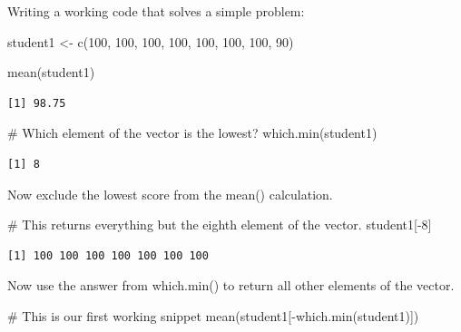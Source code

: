 \documentclass[
  letterpaper,
  DIV=11,
  numbers=noendperiod]{scrartcl}
\newenvironment{Shaded}{\begin{snugshade}}{\end{snugshade}}
\newcommand{\CommentTok}[1]{\textcolor[rgb]{0.37,0.37,0.37}{#1}}
\newcommand{\DecValTok}[1]{\textcolor[rgb]{0.68,0.00,0.00}{#1}}
\newcommand{\FunctionTok}[1]{\textcolor[rgb]{0.28,0.35,0.67}{#1}}
\newcommand{\NormalTok}[1]{\textcolor[rgb]{0.00,0.23,0.31}{#1}}
\newcommand{\OtherTok}[1]{\textcolor[rgb]{0.00,0.23,0.31}{#1}}
\newcommand{\SpecialCharTok}[1]{\textcolor[rgb]{0.37,0.37,0.37}{#1}}
\begin{document}
Writing a working code that solves a simple problem:

\begin{Shaded}
\begin{Highlighting}[]
\NormalTok{student1 }\OtherTok{\textless{}{-}} \FunctionTok{c}\NormalTok{(}\DecValTok{100}\NormalTok{, }\DecValTok{100}\NormalTok{, }\DecValTok{100}\NormalTok{, }\DecValTok{100}\NormalTok{, }\DecValTok{100}\NormalTok{, }\DecValTok{100}\NormalTok{, }\DecValTok{100}\NormalTok{, }\DecValTok{90}\NormalTok{)}

\FunctionTok{mean}\NormalTok{(student1)}
\end{Highlighting}
\end{Shaded}

\begin{verbatim}
[1] 98.75
\end{verbatim}

\begin{Shaded}
\begin{Highlighting}[]
\CommentTok{\# Which element of the vector is the lowest?}
\FunctionTok{which.min}\NormalTok{(student1)}
\end{Highlighting}
\end{Shaded}

\begin{verbatim}
[1] 8
\end{verbatim}

Now exclude the lowest score from the mean() calculation.

\begin{Shaded}
\begin{Highlighting}[]
\CommentTok{\# This returns everything but the eighth element of the vector.}
\NormalTok{student1[}\SpecialCharTok{{-}}\DecValTok{8}\NormalTok{]}
\end{Highlighting}
\end{Shaded}

\begin{verbatim}
[1] 100 100 100 100 100 100 100
\end{verbatim}

Now use the answer from which.min() to return all other elements of the
vector.

\begin{Shaded}
\begin{Highlighting}[]
\CommentTok{\# This is our first working snippet}
\FunctionTok{mean}\NormalTok{(student1[}\SpecialCharTok{{-}}\FunctionTok{which.min}\NormalTok{(student1)])}
\end{Highlighting}
\end{Shaded}
\end{document}

